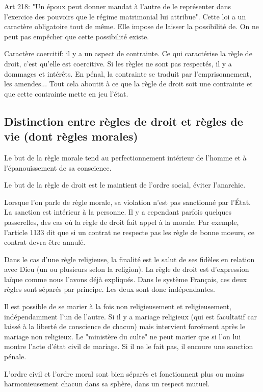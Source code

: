 \documentclass[12pt, a4paper, openany]{book}
\begin{document}
Art 218: "Un époux peut donner mandat à l'autre de le représenter dans l'exercice des pouvoirs que le régime matrimonial lui attribue". Cette loi a un caractère obligatoire tout de même. Elle impose de laisser la possibilité de. On ne peut pas empêcher que cette possibilité existe.

Caractère coercitif: il y a un aspect de contrainte. Ce qui caractérise la règle de droit, c'est qu'elle est coercitive. Si les règles ne sont pas respectés, il y a dommages et intérêts. En pénal, la contrainte se traduit par l'emprisonnement, les amendes... Tout cela aboutit à ce que la règle de droit soit une contrainte et que cette contrainte mette en jeu l'état.

\subsection{Distinction entre règles de droit et règles de vie (dont règles morales)}

Le but de la règle morale tend au perfectionnement intérieur de l'homme et à l'épanouissement de sa conscience.

Le but de la règle de droit est le maintient de l'ordre social, éviter l'anarchie. 

Lorsque l'on parle de règle morale, sa violation n'est pas sanctionné par l'État. La sanction est intérieur à la personne. Il y a cependant parfois quelques passerelles, des cas où la règle de droit fait appel à la morale. Par exemple, l'article 1133 dit que si un contrat ne respecte pas les règle de bonne moeurs, ce contrat devra être annulé. 

Dans le cas d'une règle religieuse, la finalité est le salut de ses fidèles en relation avec Dieu (un ou plusieurs selon la religion). La règle de droit est d'expression laïque comme nous l'avons déjà expliqués. Dans le système Français, ces deux règles sont séparés par principe. Les deux sont donc indépendantes.

Il est possible de se marier à la fois non religieusement et religieusement, indépendamment l'un de l'autre. Si il y a mariage religieux (qui est facultatif car laissé à la liberté de conscience de chacun) mais intervient forcément après le mariage non religieux. Le "ministère du culte" ne peut marier que si l'on lui montre l'acte d'état civil de mariage. Si il ne le fait pas, il encoure une sanction pénale.

L'ordre civil et l'ordre moral sont bien séparés et fonctionnent plus ou moins harmonieusement chacun dans sa sphère, dans un respect mutuel.
\end{document}
